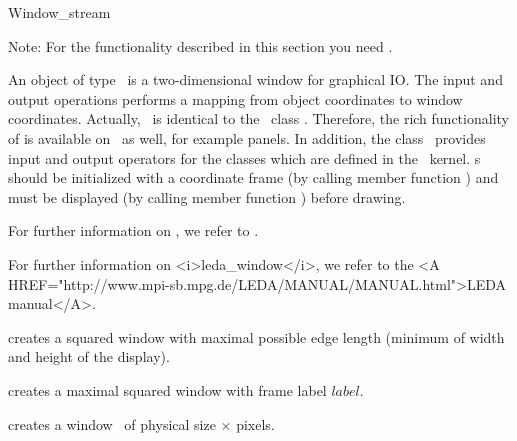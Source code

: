 \ccSetTwoColumns{}{\hspace*{8.5cm}}


\medskip
\begin{ccClass} {Window_stream}

Note: For the functionality described in this section you need \leda.

\ccDefinition 

An object of type \ccClassName\ is a two-dimensional window for
graphical IO. The input and output operations performs a mapping from
object coordinates to window coordinates.
Actually, \ccClassName\ is identical to the \leda\ class .
Therefore, the rich functionality of  is available on
\ccClassName\ as well, for example panels.
In addition, the class \ccClassName\ provides input and output 
operators for the classes which are defined in the \cgal\ kernel.
\ccClassName s should be initialized with a coordinate frame (by calling member function
) and must be displayed (by calling member function ) before
drawing.
 
\begin{ccTexOnly}
For further information on , we refer to \cite{mnsu-lum}.
\end{ccTexOnly}
\begin{ccHtmlOnly}
For further information on <i>leda_window</i>, we refer to the 
<A HREF="http://www.mpi-sb.mpg.de/LEDA/MANUAL/MANUAL.html">LEDA manual</A>.
\end{ccHtmlOnly}


\ccCreation
{}
{creates a squared window with maximal possible edge length
(minimum of width and height of the display).}

{creates a maximal squared window with frame label $label$.}

{creates a window \ccVar\ of physical size  $\times$  pixels.}



\end{ccClass}
